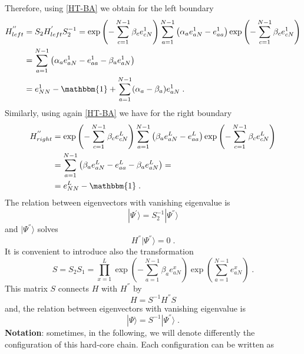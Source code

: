 \documentclass[10pt]{article}
\numberwithin{equation}{section}
\numberwithin{equation}{subsection}
\newcommand{\dt}{\;.}
\begin{document}
Therefore, using \eqref{HT-BA} we obtain for the left boundary 
\begin{equation}
	\begin{split}
		H_{left}^{''}&=S_{2}H_{left}^{'}S_{2}^{-1}=\exp{\left(-\sum_{c=1}^{N-1}\beta_{c}e_{cN}^{1}\right)}\sum_{a=1}^{N-1}\left(\alpha_{a}e_{aN}^{1}-e_{aa}^{1}\right)\exp{\left(-\sum_{c=1}^{N-1}\beta_{c}e_{cN}^{1}\right)}
		\\&=
		\sum_{a=1}^{N-1}\left(\alpha_{a}e_{aN}^{1}-e_{aa}^{1}-\beta_{a}e_{aN}^{1}\right)
		\\&=
		e_{NN}^{1}-\mathbbm{1}+\sum_{a=1}^{N-1}(\alpha_{a}-\beta_{a})e_{aN}^{1}\dt
	\end{split}
\end{equation}
Similarly, using again \eqref{HT-BA} we have for the right boundary 
\begin{equation}
	\begin{split}
			H_{right}^{''}&=\exp{\left(-\sum_{c=1}^{N-1}\beta_{c}e_{cN}^{L}\right)}\sum_{a=1}^{N-1}\left(\beta_{a}e_{aN}^{L}-e_{aa}^{L}\right)\exp{\left(-\sum_{c=1}^{N-1}\beta_{c}e_{cN}^{L}\right)}
			\\&=
			\sum_{a=1}^{N-1}\left(\beta_{a}e_{aN}^{L}-e_{aa}^{L}-\beta_{a}e_{aN}^{L}\right)=
			\\&=
			e_{NN}^{L}-\mathbbm{1}\dt
	\end{split}
\end{equation}
The relation between eigenvectors with vanishing eigenvalue is 
\begin{equation}\label{S2-Inverse}
	|\Psi^{'}\rangle = S_{2}^{-1}|\Psi^{''}\rangle
\end{equation}
and $|\Psi^{''}\rangle$ solves
\begin{equation}\label{steadyS-SECOND-def}
	H^{''}|\Psi^{''}\rangle=0\dt
\end{equation}
It is convenient to introduce also the transformation
\begin{equation}\label{similarity}
	S=S_{2}S_{1}=\prod_{x=1}^{L}\exp{\left(-\sum_{a=1}^{N-1}\beta_{a}e_{aN}^{x}\right)}\exp{\left(\sum_{a=1}^{N-1}e_{aN}^{x}\right)}\dt
\end{equation}
This matrix $S$ connects $H$ with $H^{''}$ by 
\begin{equation}
H=S^{-1}H^{''}S
\end{equation}
and, the relation between eigenvectors with vanishing eigenvalue is
\begin{equation}
	|\Psi\rangle=S^{-1}|\Psi^{''}\rangle\dt
\end{equation}
\textbf{Notation}: sometimes, in the following, we will denote differently the configuration of this hard-core chain. Each configuration can be written as
\end{document}
